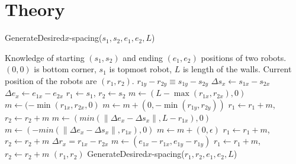\section{Theory}
\label{sec:theory}

\begin{algorithm}
\caption{GenerateDesired$x$-spacing($s_1,s_2,e_1,e_2,L$)}\label{alg:XControl}
\begin{algorithmic}[1]
\Require Knowledge of starting $(s_1,s_2)$ and ending $(e_1,e_2)$ positions of  two robots. 
$(0,0)$ is bottom corner, $s_1$ is topmost robot, 
 $L$ is length of the walls. Current position of the robots are $(r_1,r_2)$.
\Ensure   $ r_{1y} - r_{2y}  \equiv s_{1y} - s_{2y} $   %
\State $ \Delta s_x  \gets s_{1x} - s_{2x} $
\State $ \Delta e_x \gets e_{1x} - e_{2x} $
\State $ r_1 \gets s_1$, $ r_2 \gets s_2$
\State $ m \gets ( L-\max( r_{1x},r_{2x}) ,0)   $ 
\Else 
\State  $ m \gets ( -\min( r_{1x},r_{2x},0 )    $ 
\EndIf
\State $m  \gets  m + (0, -\min( r_{1y},r_{2y} ))$ 
\State $ r_1 \gets r_1+m$, $ r_2 \gets r_2+m$ 
\State $ m \gets (min(\|\Delta e_x - \Delta s_x \|, L- r_{1x}), 0)$  
\Else
\State $ m \gets (-min(\|\Delta e_x - \Delta s_x \|, r_{1x}), 0)$
\EndIf 
\State $m  \gets  m + (0, \epsilon)$ 
\State $ r_1 \gets r_1+m$, $ r_2 \gets r_2+m$ 
\State $\Delta r_x = r_{1x} - r_{2x}$
\State   $ m \gets (e_{1x}-r_{1x}, e_{1y}-r_{1y})$
\State $ r_1 \gets r_1+m$, $ r_2 \gets r_2+m$ 
\State  \Return $(r_1,r_2)$
\Else   
\State \Return GenerateDesired$x$-spacing($r_1,r_2,e_1,e_2,L$)
\EndIf
\end{algorithmic}
\end{algorithm}


